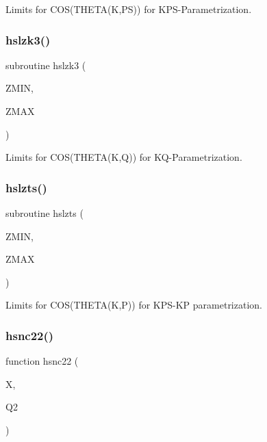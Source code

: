 Limits for C\+O\+S(\+T\+H\+E\+T\+A(\+K,\+P\+S)) for K\+P\+S-\/\+Parametrization. 

\mbox{\label{djangoh__h_8f_a2857c36abf6cf55c0980cfaa59a9f348}} 
\subsubsection{\texorpdfstring{hslzk3()}{hslzk3()}}
{\footnotesize\ttfamily subroutine hslzk3 (\begin{DoxyParamCaption}\item[{}]{Z\+M\+IN,  }\item[{}]{Z\+M\+AX }\end{DoxyParamCaption})}



Limits for C\+O\+S(\+T\+H\+E\+T\+A(\+K,\+Q)) for K\+Q-\/\+Parametrization. 

\mbox{\label{djangoh__h_8f_a7b2ae9bd269d18a4870a966f53575c8f}} 
\subsubsection{\texorpdfstring{hslzts()}{hslzts()}}
{\footnotesize\ttfamily subroutine hslzts (\begin{DoxyParamCaption}\item[{}]{Z\+M\+IN,  }\item[{}]{Z\+M\+AX }\end{DoxyParamCaption})}



Limits for C\+O\+S(\+T\+H\+E\+T\+A(\+K,\+P)) for K\+P\+S-\/\+KP parametrization. 

\mbox{\label{djangoh__h_8f_ad7d53866766435b499ef5948b8d30693}} 
\subsubsection{\texorpdfstring{hsnc22()}{hsnc22()}}
{\footnotesize\ttfamily function hsnc22 (\begin{DoxyParamCaption}\item[{}]{X,  }\item[{}]{Q2 }\end{DoxyParamCaption})}

